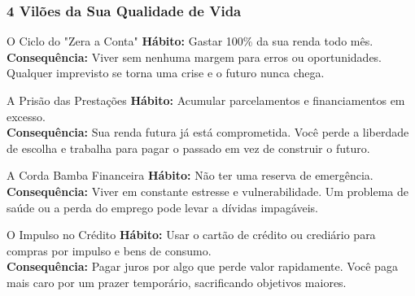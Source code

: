 \begin{frame}[t]
  \frametitle{4 Vilões da Sua Qualidade de Vida}

  \begin{block}{\large \textcolor{orange}{}\quad O Ciclo do "Zera a Conta"}
    \textbf{Hábito:} Gastar 100\% da sua renda todo mês. \\
    \textbf{Consequência:} Viver sem nenhuma margem para erros ou oportunidades. Qualquer imprevisto se torna uma crise e o futuro nunca chega.
  \end{block}

  \begin{block}{\large \color{red}\quad A Prisão das Prestações}
    \textbf{Hábito:} Acumular parcelamentos e financiamentos em excesso. \\
    \textbf{Consequência:} Sua renda futura já está comprometida. Você perde a liberdade de escolha e trabalha para pagar o passado em vez de construir o futuro.
  \end{block}

  \begin{block}{\large \color{purple}\quad A Corda Bamba Financeira}
    \textbf{Hábito:} Não ter uma reserva de emergência. \\
    \textbf{Consequência:} Viver em constante estresse e vulnerabilidade. Um problema de saúde ou a perda do emprego pode levar a dívidas impagáveis.
  \end{block}

  \begin{block}{\large \color{brown}\quad O Impulso no Crédito}
    \textbf{Hábito:} Usar o cartão de crédito ou crediário para compras por impulso e bens de consumo. \\
    \textbf{Consequência:} Pagar juros por algo que perde valor rapidamente. Você paga mais caro por um prazer temporário, sacrificando objetivos maiores.
  \end{block}

\end{frame}